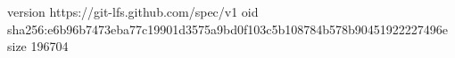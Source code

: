 version https://git-lfs.github.com/spec/v1
oid sha256:e6b96b7473eba77c19901d3575a9bd0f103c5b108784b578b90451922227496e
size 196704
